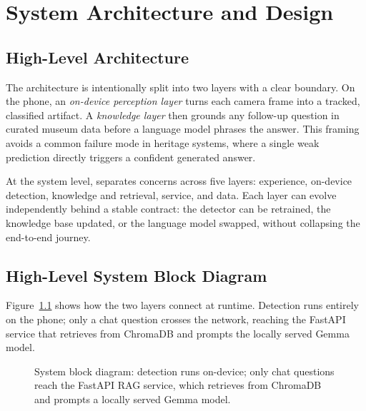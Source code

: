 \chapter{System Architecture and Design}

\section{High-Level Architecture}

The architecture is intentionally split into two layers with a clear boundary. On the
phone, an \emph{on-device perception layer} turns each camera frame into a tracked,
classified artifact. A \emph{knowledge layer} then grounds any follow-up question in
curated museum data before a language model phrases the answer. This framing avoids a
common failure mode in heritage systems, where a single weak prediction directly
triggers a confident generated answer.

At the system level, \TimeLens{} separates concerns across five layers: experience,
on-device detection, knowledge and retrieval, service, and data. Each layer can evolve
independently behind a stable contract: the detector can be retrained, the knowledge
base updated, or the language model swapped, without collapsing the end-to-end journey.

\section{High-Level System Block Diagram}

Figure~\ref{fig:block} shows how the two layers connect at runtime. Detection runs
entirely on the phone; only a chat question crosses the network, reaching the FastAPI
service that retrieves from ChromaDB and prompts the locally served Gemma model.

\begin{figure}[htbp]
\centering
{}
\caption{System block diagram: detection runs on-device; only chat questions reach the
FastAPI RAG service, which retrieves from ChromaDB and prompts a locally served Gemma
model.}
\label{fig:block}
\end{figure}

